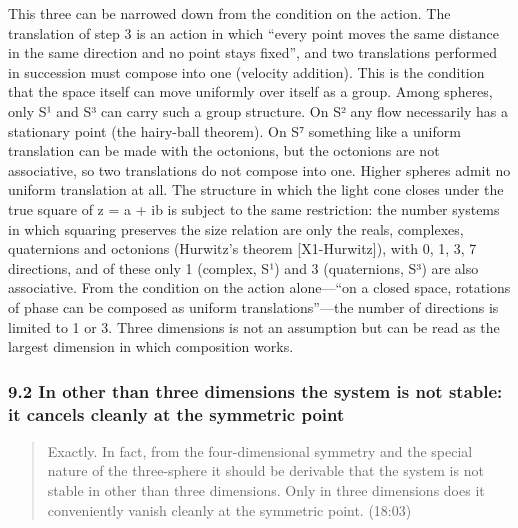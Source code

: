 \documentclass[
  a4paper,
]{article}
\begin{document}
This three can be narrowed down from the condition on the action. The
translation of step 3 is an action in which ``every point moves the same
distance in the same direction and no point stays fixed'', and two
translations performed in succession must compose into one (velocity
addition). This is the condition that the space itself can move
uniformly over itself as a group. Among spheres, only S¹ and S³ can
carry such a group structure. On S² any flow necessarily has a
stationary point (the hairy-ball theorem). On S⁷ something like a
uniform translation can be made with the octonions, but the octonions
are not associative, so two translations do not compose into one. Higher
spheres admit no uniform translation at all. The structure in which the
light cone closes under the true square of z = a + ib is subject to the
same restriction: the number systems in which squaring preserves the
size relation are only the reals, complexes, quaternions and octonions
(Hurwitz's theorem {[}X1-Hurwitz{]}), with 0, 1, 3, 7 directions, and of
these only 1 (complex, S¹) and 3 (quaternions, S³) are also associative.
From the condition on the action alone---``on a closed space, rotations
of phase can be composed as uniform translations''---the number of
directions is limited to 1 or 3. Three dimensions is not an assumption
but can be read as the largest dimension in which composition works.

\subsubsection{9.2 In other than three dimensions the system is not
stable: it cancels cleanly at the symmetric
point}\label{in-other-than-three-dimensions-the-system-is-not-stable-it-cancels-cleanly-at-the-symmetric-point}

\begin{quote}
Exactly. In fact, from the four-dimensional symmetry and the special
nature of the three-sphere it should be derivable that the system is not
stable in other than three dimensions. Only in three dimensions does it
conveniently vanish cleanly at the symmetric point. (18:03)
\end{quote}
\end{document}
